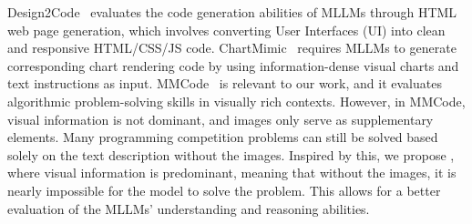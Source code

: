 Design2Code~\cite{si2024design2code} evaluates the code generation abilities of MLLMs through HTML web page generation, which involves converting User Interfaces (UI) into clean and responsive HTML/CSS/JS code. ChartMimic~\cite{shi2024chartmimic} requires MLLMs to generate corresponding chart rendering code by using information-dense visual charts and text instructions as input. MMCode~\cite{li2024mmcode} is relevant to our work, and it evaluates algorithmic problem-solving skills in visually rich contexts. However, in MMCode, visual information is not dominant, and images only serve as supplementary elements. Many programming competition problems can still be solved based solely on the text description without the images. Inspired by this, we propose \benchmark, where visual information is predominant, meaning that without the images, it is nearly impossible for the model to solve the problem. This allows for a better evaluation of the MLLMs' understanding and reasoning abilities.



